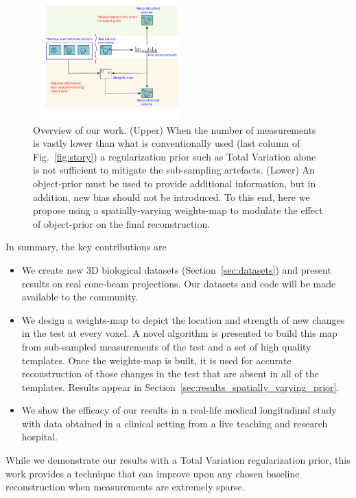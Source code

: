 \documentclass[journal]{IEEEtran}
\begin{document}
 \begin{figure}[h]
\centering
	\includegraphics[width=0.5\textwidth]{../images/prior_cmb.png}
        \caption{Overview of our work. (Upper) When the number of
          measurements is vastly lower than what is conventionally
          used (last column of Fig.~\ref{fig:story}) a regularization
          prior such as Total Variation alone is not sufficient to
          mitigate the sub-sampling artefacts. (Lower) An object-prior
          must be used to provide additional information, but in
          addition, new bias should not be introduced. To this end,
          here we propose using a spatially-varying weights-map to
          modulate the effect of object-prior on the final
          reconstruction.}
 \label{fig:prior_overview}
\end{figure}

In summary, the key contributions are
\begin{itemize}
\item We create new 3D biological datasets (Section~\ref{sec:datasets}) and
  present results on real cone-beam projections. Our datasets and code
  will be made available to the community.
  \item We design a weights-map
    to depict the location and strength of new changes in the test at
    every voxel. A novel algorithm is presented to build this map from
    sub-sampled measurements of the test and a set of high quality
    templates. Once the weights-map is built, it is used for accurate
    reconstruction of those changes in the test that are absent in all
    of the templates. Results appear in
    Section~\ref{sec:results_spatially_varying_prior}.
  \item We show the efficacy of our results in a real-life medical
    longitudinal study with data obtained in a clinical setting from
    a live teaching and
    research hospital.
\end{itemize}
While we demonstrate our results with a Total Variation regularization
prior, this work provides a technique that can improve upon any chosen
baseline reconstruction when measurements are extremely sparse.  
\end{document}
